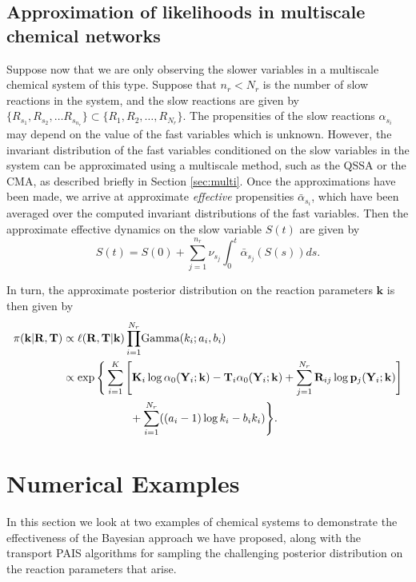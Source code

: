 \documentclass[final]{siamltex}
\begin{document}
\subsection{Approximation of likelihoods in multiscale chemical
  networks}
Suppose now that we are only observing the slower variables in a
multiscale chemical system of this type. Suppose that $n_r < N_r$ is the number of slow
reactions in the system, and the slow reactions are given by $\{R_{s_1},
R_{s_2}, \ldots R_{s_{n_r}} \} \subset \{R_1, R_2, \ldots , R_{N_r}
\}$. The propensities of the slow
reactions $\alpha_{s_i}$ may depend on the value of the fast variables which is
unknown. However, the invariant distribution of the fast variables
conditioned on the slow variables in the system can be approximated
using a multiscale method, such as the QSSA or the CMA, as described
briefly in Section \ref{sec:multi}. Once the approximations have been
made, we arrive at approximate \emph{effective} propensities $\bar{\alpha}_{s_i}$, which
have been averaged over the computed invariant distributions of the
fast variables. Then the approximate effective dynamics on the slow variable $S(t)$ are given by 
\begin{equation}\label{eq:RTCS}
S(t) = S(0) + \sum_{j=1}^{n_r} \nu_{s_j} \int_0^t \bar{\alpha}_{s_j}(S(s)) ds.
\end{equation}

In turn, the approximate posterior distribution on the reaction
parameters $\mathbf{k}$ is then given by
\begin{align}
	\pi(\mathbf{k}|\mathbf{R}, \mathbf{T}) &\propto \ell(\mathbf{R}, \mathbf{T}|\mathbf{k})
	\prod_{i=1}^{N_r} \! \text{Gamma}(k_i; a_i, b_i) \notag \\
		&\propto \exp\Bigg\{\sum\limits_{i=1}^K \Bigg[
				\mathbf{K}_i\log \alpha_0(\mathbf{Y}_i; \mathbf{k}) - \mathbf{T}_i\alpha_0(\mathbf{Y}_i; \mathbf{k}) %
				+\sum_{j=1}^{N_r} \mathbf{R}_{ij}\log\mathbf{p}_j(\mathbf{Y}_i; \mathbf{k})
			\Bigg]  \notag\\
		&	\qquad\qquad\qquad{} + \sum_{i=1}^{N_r} ((a_i-1)\log k_i - b_ik_i)\Bigg\}. \label{eq:Apos}
\end{align}

\section{Numerical Examples}\label{sec:num}
In this section we look at two examples of chemical systems to
demonstrate the effectiveness of the Bayesian approach we have
proposed, along with the transport PAIS algorithms for sampling the
challenging posterior distribution on the reaction parameters that
arise. 
\end{document}
